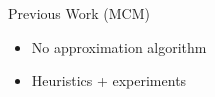 \begin{frame}{Previous Work (MCM)}
\begin{itemize}
  \item No approximation algorithm
  \item Heuristics + experiments
\end{itemize}
\end{frame}